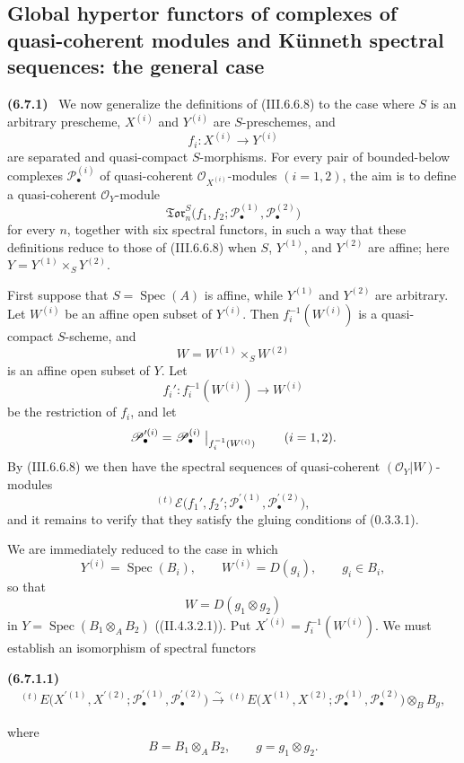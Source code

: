 \documentclass[10pt,oneside]{book}
\newcommand{\sh}[1]{\mathscr{#1}}
\newcommand{\Spec}{\operatorname{Spec}}
\newcommand{\sref}[2][]{(#2)}
\newenvironment{env}[1][]{\par\medskip\noindent\textbf{(#1)}\ }{\par}
\begin{document}
\subsection{Global hypertor functors of complexes of quasi-coherent modules and K\"unneth spectral sequences: the general case}
\label{subsection:III.6.7}

\begin{env}[6.7.1]
\label{III.6.7.1}
We now generalize the definitions of \sref{III.6.6.8} to the
case where $S$ is an arbitrary prescheme, $X^{(i)}$ and
$Y^{(i)}$ are $S$-preschemes, and
\[
  f_i:X^{(i)}\longrightarrow Y^{(i)}
\]
are separated and quasi-compact $S$-morphisms.  For every pair
of bounded-below complexes $\sh P_\bullet^{(i)}$ of
quasi-coherent $\sh O_{X^{(i)}}$-modules $(i=1,2)$, the aim is to
define a quasi-coherent $\sh O_Y$-module
\[
  \mathfrak{Tor}_n^S
  \bigl(
    f_1,f_2;
    \sh P_\bullet^{(1)},\sh P_\bullet^{(2)}
  \bigr)
\]
for every $n$, together with six spectral functors, in such a way
that these definitions reduce to those of \sref{III.6.6.8} when
$S$, $Y^{(1)}$, and $Y^{(2)}$ are affine; here
$Y=Y^{(1)}\times_SY^{(2)}$.

First suppose that $S=\Spec(A)$ is affine, while $Y^{(1)}$ and
$Y^{(2)}$ are arbitrary.  Let $W^{(i)}$ be an affine open subset
of $Y^{(i)}$.  Then $f_i^{-1}(W^{(i)})$ is a quasi-compact
$S$-scheme, and
\[
  W=W^{(1)}\times_SW^{(2)}
\]
is an affine open subset of $Y$.  Let
\[
  f_i':f_i^{-1}(W^{(i)})\longrightarrow W^{(i)}
\]
be the restriction of $f_i$, and let
\[
  \sh P_\bullet^{\prime(i)}
  =
  \sh P_\bullet^{(i)}
  \bigm|_{f_i^{-1}(W^{(i)})}
  \qquad(i=1,2).
\]
By \sref{III.6.6.8} we then have the spectral sequences of
quasi-coherent $(\sh O_Y|W)$-modules
\[
  {}^{(t)}\sh E
  \bigl(
    f_1',f_2';
    \sh P_\bullet^{\prime(1)},\sh P_\bullet^{\prime(2)}
  \bigr),
\]
and it remains to verify that they satisfy the gluing conditions
of \sref[0]{0.3.3.1}.

We are immediately reduced to the case in which
\[
  Y^{(i)}=\Spec(B_i),
  \qquad
  W^{(i)}=D(g_i),
  \qquad g_i\in B_i,
\]
so that
\[
  W=D(g_1\otimes g_2)
\]
in $Y=\Spec(B_1\otimes_AB_2)$
(\sref[II]{II.4.3.2.1}).  Put
$X^{\prime(i)}=f_i^{-1}(W^{(i)})$.  We must establish an
isomorphism of spectral functors
\begin{env}[6.7.1.1]
\label{III.6.7.1.1}
\[
\begin{split}
  {}^{(t)}E
  \bigl(
    X^{\prime(1)},X^{\prime(2)};
    \sh P_\bullet^{\prime(1)},\sh P_\bullet^{\prime(2)}
  \bigr)
  \xrightarrow{\sim}
  {}^{(t)}E
  \bigl(
    X^{(1)},X^{(2)};
    \sh P_\bullet^{(1)},\sh P_\bullet^{(2)}
  \bigr)
  \otimes_BB_g ,
\end{split}
\tag{6.7.1.1}\label{III.6.7.1.1.eq}
\]
\end{env}
where
\[
  B=B_1\otimes_AB_2,
  \qquad
  g=g_1\otimes g_2.
\]


\end{env}
\end{document}
